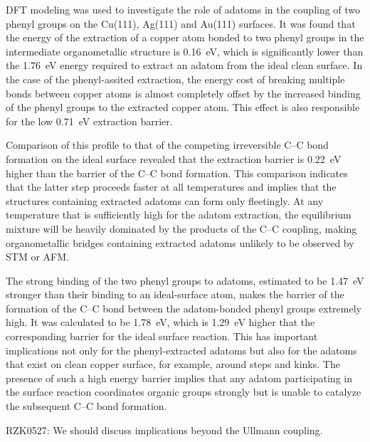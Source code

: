 \documentclass[%
 reprint,
 amsmath,amssymb,
 aps,
prb,
floatfix,
]{revtex4-2}
\newcommand{\lock}{\color{red}}
\newcommand{\lock}{\color{black}}
\newcommand{\comm}{\color{ForestGreen}} %
\begin{document}
{\lock

DFT modeling was used to investigate the role of adatoms in the coupling of two phenyl groups on the Cu(111), Ag(111) and Au(111) surfaces. It was found that the energy of the extraction of a copper atom bonded to two phenyl groups in the intermediate organometallic structure is \SI{0.16}{\electronvolt}, which is significantly lower than the \SI{1.76}{\electronvolt} energy required to extract an adatom from the ideal clean surface. In the case of the phenyl-assited extraction, the energy cost of breaking multiple bonds between copper atoms is almost completely offset by the increased binding of the phenyl groups to the extracted copper atom. This effect is also responsible for the low \SI{0.71}{\electronvolt} extraction barrier. 

Comparison of this profile to that of the competing irreversible C--C bond formation on the ideal surface revealed that the extraction barrier is \SI{0.22}{\electronvolt} higher than the barrier of the C--C bond formation. This comparison indicates that the latter step proceeds faster at all temperatures and implies that the structures containing extracted adatoms can form only fleetingly. At any temperature that is sufficiently high for the adatom extraction, the equilibrium mixture will be heavily dominated by the products of the C--C coupling, making organometallic bridges containing extracted adatoms unlikely to be observed by STM or AFM.

The strong binding of the two phenyl groups to adatoms, estimated to be \SI{1.47}{\electronvolt} stronger than their binding to an ideal-surface atom, makes the barrier of the formation of the C--C bond between the adatom-bonded phenyl groups extremely high. It was calculated to be \SI{1.78}{\electronvolt}, which is \SI{1.29}{\electronvolt} higher that the corresponding barrier for the ideal surface reaction. This has important implications not only for the phenyl-extracted adatoms but also for the adatoms that exist on clean copper surface, for example, around steps and kinks. The presence of such a high energy barrier implies that any adatom participating in the surface reaction coordinates organic groups strongly but is unable to catalyze the subsequent C--C bond formation.

{\comm RZK0527: We should discuss implications beyond the Ullmann coupling.}%

}
\end{document}
